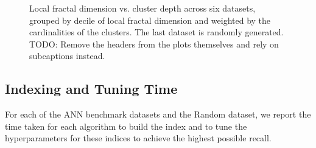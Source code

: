 \begin{figure}
\begin{subfigure}[b]{0.47\textwidth}
    \label{fig:results:random-lfd}
    \end{subfigure}
    \vspace{1em}
    \caption{Local fractal dimension vs. cluster depth across six datasets, grouped by decile of local fractal dimension and weighted by the cardinalities of the clusters.
    The last dataset is randomly generated.
    {\color{red} TODO: Remove the headers from the plots themselves and rely on subcaptions instead.}}
    \label{fig:results:lfd-plots}
\end{figure}

\subsection{Indexing and Tuning Time}
\label{subsec:indexing-time-results}


For each of the ANN benchmark datasets and the Random dataset, we report the time taken for each algorithm to build the index and to tune the hyperparameters for these indices to achieve the highest possible recall. 


